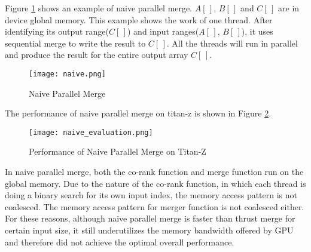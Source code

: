     Figure \ref{fig:naive} shows an example of naive parallel merge. $A[\,]$, $B[\,]$ and $C[\,]$ 
    are in device global memory. This example shows the work of one thread. After identifying
    its output range($C[\,]$) and input ranges($A[\,]$, $B[\,]$), it uses sequential merge to write the
    result to $C[\,]$. All the threads will run in parallel and produce the result for the entire 
    output array $C[\,]$.   

    \begin{figure}[!h]
    \begin{center}
    \texttt{[image: naive.png]}
    \end{center}
    \caption{{\label{fig:naive}} Naive Parallel Merge}
    \end{figure}

    The performance of naive parallel merge on titan-z is shown in Figure \ref{fig:naive_evaluation}.
      
    \begin{figure}[!h]
    \begin{center}
    \texttt{[image: naive\_evaluation.png]}
    \end{center}
    \caption{{\label{fig:naive_evaluation}} Performance of Naive Parallel Merge on Titan-Z}
    \end{figure}

    In naive parallel merge, both the co-rank function and merge function run on the global memory. Due to 
    the nature of the co-rank function, in which each thread is doing a binary search for its own input 
    index, the memory access pattern is not coalesced. The memory access pattern for merger function
    is not coalesced either. For these reasons, although naive parallel merge is faster than thrust merge 
    for certain input size, it still underutilizes the memory 
    bandwidth offered by GPU and therefore did not achieve the optimal overall performance.


%   
%
